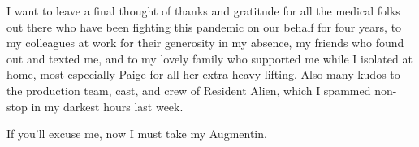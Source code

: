 \documentclass{article}
\begin{document}
I want to leave a final thought of thanks and gratitude for all the medical folks out there who have been fighting this pandemic on our behalf for four years, to my colleagues at work for their generosity in my absence, my friends who found out and texted me, and to my lovely family who supported me while I isolated at home, most especially Paige for all her extra heavy lifting. Also many kudos to the production team, cast, and crew of Resident Alien, which I spammed non-stop in my darkest hours last week.

If you'll excuse me, now I must take my Augmentin. 
\end{document}
